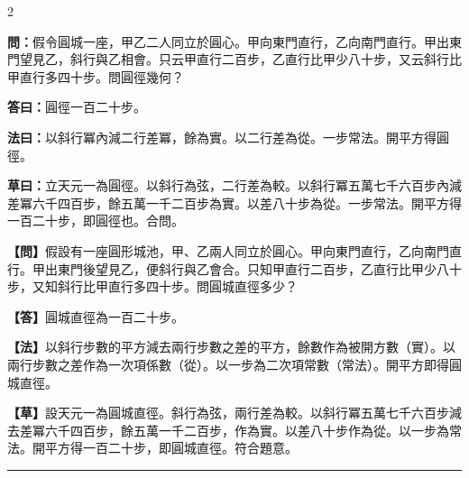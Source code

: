 \documentclass[11pt,a4paper]{article}
\newcommand{\longline}{\noindent\rule{\textwidth}{0.4pt}}
\newcommand{\wenC}[1]{\par\noindent\textbf{\textcolor{probcolor}{問：}}{#1}\par}
\newcommand{\daC}[1]{\par\noindent\textbf{\textcolor{anscolor}{答曰：}}{#1}\par}
\newcommand{\fayueC}[1]{\par\noindent\textbf{\textcolor{methodcolor}{法曰：}}{#1}\par}
\newcommand{\caoyueC}[1]{\par\noindent\textbf{草曰：}{#1}\par}
\newcommand{\wenM}[1]{\par\noindent\textbf{\textcolor{probcolor}{【問】}}{#1}\par}
\newcommand{\daM}[1]{\par\noindent\textbf{\textcolor{anscolor}{【答】}}{#1}\par}
\newcommand{\fayueM}[1]{\par\noindent\textbf{\textcolor{methodcolor}{【法】}}{#1}\par}
\newcommand{\caoyueM}[1]{\par\noindent\textbf{【草】}{#1}\par}
\begin{document}
\begin{paracol}{2}

\wenC{假令圓城一座，甲乙二人同立於圓心。甲向東門直行，乙向南門直行。甲出東門望見乙，斜行與乙相會。只云甲直行二百步，乙直行比甲少八十步，又云斜行比甲直行多四十步。問圓徑幾何？}

\daC{圓徑一百二十步。}

\fayueC{以斜行冪內減二行差冪，餘為實。以二行差為從。一步常法。開平方得圓徑。}

\caoyueC{立天元一為圓徑。以斜行為弦，二行差為較。以斜行冪五萬七千六百步內減差冪六千四百步，餘五萬一千二百步為實。以差八十步為從。一步常法。開平方得一百二十步，即圓徑也。合問。}

\switchcolumn

\wenM{假設有一座圓形城池，甲、乙兩人同立於圓心。甲向東門直行，乙向南門直行。甲出東門後望見乙，便斜行與乙會合。只知甲直行二百步，乙直行比甲少八十步，又知斜行比甲直行多四十步。問圓城直徑多少？}

\daM{圓城直徑為一百二十步。}

\fayueM{以斜行步數的平方減去兩行步數之差的平方，餘數作為被開方數（實）。以兩行步數之差作為一次項係數（從）。以一步為二次項常數（常法）。開平方即得圓城直徑。}

\caoyueM{設天元一為圓城直徑。斜行為弦，兩行差為較。以斜行冪五萬七千六百步減去差冪六千四百步，餘五萬一千二百步，作為實。以差八十步作為從。以一步為常法。開平方得一百二十步，即圓城直徑。符合題意。}

\end{paracol}

\vspace{0.3cm}
\longline
\end{document}
